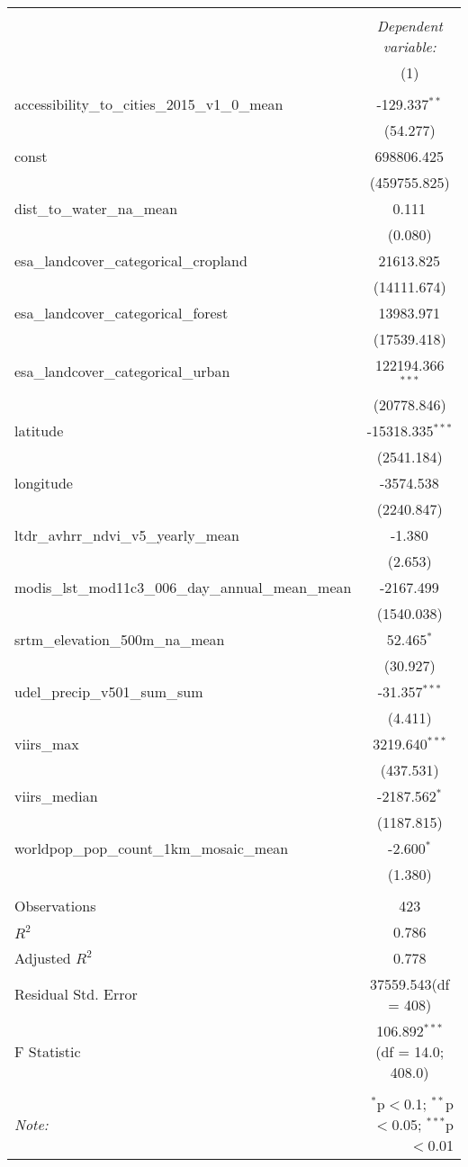 \begin{table}[!htbp] \centering
\begin{tabular}{@{\extracolsep{5pt}}lc}
\\[-1.8ex]\hline
\hline \\[-1.8ex]
& \multicolumn{1}{c}{\textit{Dependent variable:}} \
\cr \cline{1-2}
\\[-1.8ex] & (1) \\
\hline \\[-1.8ex]
 accessibility_to_cities_2015_v1_0_mean & -129.337$^{**}$ \\
  & (54.277) \\
 const & 698806.425$^{}$ \\
  & (459755.825) \\
 dist_to_water_na_mean & 0.111$^{}$ \\
  & (0.080) \\
 esa_landcover_categorical_cropland & 21613.825$^{}$ \\
  & (14111.674) \\
 esa_landcover_categorical_forest & 13983.971$^{}$ \\
  & (17539.418) \\
 esa_landcover_categorical_urban & 122194.366$^{***}$ \\
  & (20778.846) \\
 latitude & -15318.335$^{***}$ \\
  & (2541.184) \\
 longitude & -3574.538$^{}$ \\
  & (2240.847) \\
 ltdr_avhrr_ndvi_v5_yearly_mean & -1.380$^{}$ \\
  & (2.653) \\
 modis_lst_mod11c3_006_day_annual_mean_mean & -2167.499$^{}$ \\
  & (1540.038) \\
 srtm_elevation_500m_na_mean & 52.465$^{*}$ \\
  & (30.927) \\
 udel_precip_v501_sum_sum & -31.357$^{***}$ \\
  & (4.411) \\
 viirs_max & 3219.640$^{***}$ \\
  & (437.531) \\
 viirs_median & -2187.562$^{*}$ \\
  & (1187.815) \\
 worldpop_pop_count_1km_mosaic_mean & -2.600$^{*}$ \\
  & (1.380) \\
\hline \\[-1.8ex]
 Observations & 423 \\
 $R^2$ & 0.786 \\
 Adjusted $R^2$ & 0.778 \\
 Residual Std. Error & 37559.543(df = 408)  \\
 F Statistic & 106.892$^{***}$ (df = 14.0; 408.0) \\
\hline
\hline \\[-1.8ex]
\textit{Note:} & \multicolumn{1}{r}{$^{*}$p$<$0.1; $^{**}$p$<$0.05; $^{***}$p$<$0.01} \\
\end{tabular}
\end{table}